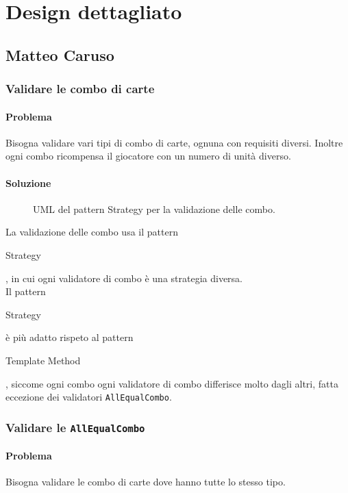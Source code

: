 \documentclass[a4paper,12pt]{report}
\begin{document}
\section{Design dettagliato}
\subsection{Matteo Caruso}
\subsubsection{Validare le combo di carte}
\paragraph{Problema}
Bisogna validare vari tipi di combo di carte, ognuna con requisiti diversi. Inoltre ogni combo ricompensa il giocatore con un numero di unità diverso.
\paragraph{Soluzione}
\begin{figure}[H]
	\centering
	
	\caption{UML del pattern Strategy per la validazione delle combo.}
\end{figure}
La validazione delle combo usa il pattern \begin{itshape}Strategy\end{itshape}, in cui ogni validatore di combo è una strategia diversa.
\\
Il pattern \begin{itshape}Strategy\end{itshape} è più adatto rispeto al pattern \begin{itshape}Template Method\end{itshape}, siccome ogni combo ogni validatore di combo differisce molto dagli altri, fatta eccezione dei validatori \texttt{AllEqualCombo}.

\subsubsection{Validare le \texttt{AllEqualCombo}}
\paragraph{Problema}
Bisogna validare le combo di carte dove hanno tutte lo stesso tipo.
\end{document}
